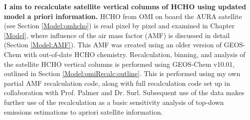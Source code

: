   \textbf{I aim to recalculate satellite vertical columns of HCHO using updated model a priori information.}
  HCHO from OMI on board the AURA satellite (see Section \ref{Model:omhcho}) is read pixel by pixel and examined in Chapter \ref{Model}, where influence of the air mass factor (AMF) is discussed in detail (Section \ref{Model:AMF}).
  This AMF was created using an older version of GEOS-Chem with out-of-date HCHO chemistry.
  Recalculation, binning, and analysis of the satellite HCHO vertical columns is performed using GEOS-Chem v10.01, outlined in Section \ref{Model:omiRecalc:outline}.
  This is performed using my own partial AMF recalculation code, along with full recalculation code set up in collaboration with Prof. Palmer and Dr. Surl.
  Subsequent use of the data makes further use of the recalculation as a basic sensitivity analysis of top-down emissions estimations to apriori satellite information.
   
